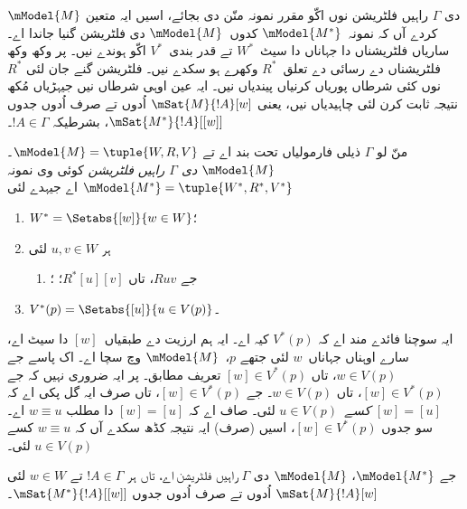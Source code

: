 \documentclass[../../../include/open-logic-section]{subfiles}
\begin{document}


$\mModel{M}$ دی $\Gamma$ راہیں فلٹریشن نوں اکّو مقرر نمونہ منّن دی بجائے، اسیں ایہ متعین کردے آں کہ نمونہ~$\mModel{M^*}$ کدوں~$\mModel{M}$ دی فلٹریشن گنیا جاندا اے۔ ساریاں فلٹریشناں دا جہاناں دا سیٹ~$W^*$ تے قدر بندی~$V^*$ اکّو ہوندے نیں۔ پر وکھ وکھ فلٹریشناں دے رسائی دے تعلق~$R^*$ وکھرے ہو سکدے نیں۔ فلٹریشن گنے جان لئی $R^*$ نوں کئی شرطاں پوریاں کرنیاں پیندیاں نیں۔ ایہ عین اوہی شرطاں نیں جیہڑیاں مُکھ نتیجہ ثابت کرن لئی چاہیدیاں نیں، یعنی $\mSat{M}{!A}[w]$ اُدوں تے صرف اُدوں جدوں $\mSat{M^*}{!A}[{[w]}]$، بشرطیکہ $!A \in
\Gamma$۔

\begin{defn}
  منّ لو $\Gamma$ ذیلی فارمولیاں تحت بند اے تے $\mModel{M} = \tuple{W,
    R, V}$۔ \emph{$\mModel{M}$ دی $\Gamma$ راہیں فلٹریشن} کوئی وی نمونہ $\mModel{M^*} = \tuple{W^*,R^*,V^*}$ اے جیہدے لئی
  \begin{enumerate}
  \item $W^* = \Setabs{[w]}{w \in W}$؛
  \item {}%
    ہر $u,v \in W$ لئی
    \begin{enumerate}
    \item {}%
      جے $Ruv$، تاں $R^*[u][v]$؛
    ؛
    \end{enumerate}
  \item $V^*(p) = \Setabs{[u]}{u \in V(p)}$۔
  \end{enumerate}
\end{defn}

ایہ سوچنا فائدے مند اے کہ $V^*(p)$ کیہ اے۔ ایہ ہم ارزیت دے طبقیاں~$[w]$ دا سیٹ اے، سارے اوہناں جہاناں~$w$ لئی جتھے $p$،~$\mModel{M}$ وچ سچا اے۔ اک پاسے جے $w \in V(p)$، تاں $[w] \in
V^*(p)$ تعریف مطابق۔ پر ایہ ضروری نہیں کہ جے $[w] \in V^*(p)$، تاں $w \in V(p)$۔ جے $[w] \in V^*(p)$، تاں صرف ایہ گل پکی اے کہ $[w] = [u]$ \emph{کسے}~$u \in V(p)$ لئی۔ صاف اے کہ $[w] = [u]$ دا مطلب $w \equiv u$ اے۔ سو جدوں $[w] \in
V^*(p)$، اسیں (صرف) ایہ نتیجہ کڈھ سکدے آں کہ $w \equiv u$ کسے $u \in
V(p)$ لئی۔

\begin{thm}
  جے $\mModel{M^*}$، $\mModel{M}$ دی $\Gamma$ راہیں فلٹریشن اے، تاں ہر $!A \in \Gamma$ تے $w \in W$ لئی
  $\mSat{M}{!A}[w]$ اُدوں تے صرف اُدوں جدوں $\mSat{M^*}{!A}[{[w]}]$۔
\end{thm}
\end{document}

